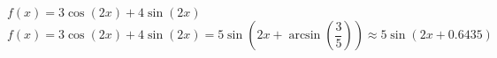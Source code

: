  {$f(x) = 3\cos(2x) + 4\sin(2x)$}
{ $f(x) = 3\cos(2x) + 4\sin(2x) = 5\sin\left(2x+\arcsin\left(\dfrac{3}{5}\right) \right) \approx 5\sin(2x+0.6435)$}
